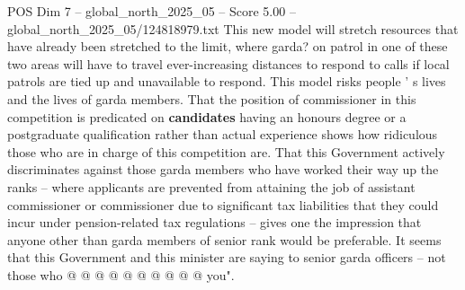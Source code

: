 \begin{textsample}{POS Dim 7 – global\_north\_2025\_05 – Score 5.00 – global\_north\_2025\_05/124818979.txt}
This new model will stretch resources that have already been stretched to the limit, where garda? on patrol in one of these two areas will have to travel ever-increasing distances to respond to calls if local patrols are tied up and unavailable to respond.
This model risks people ' s lives and the lives of garda members.
That the position of commissioner in this competition is predicated on \textbf{candidates} having an honours degree or a postgraduate qualification rather than actual experience shows how ridiculous those who are in charge of this competition are.
That this Government actively discriminates against those garda members who have worked their way up the ranks -- where applicants are prevented from attaining the job of assistant commissioner or commissioner due to significant tax liabilities that they could incur under pension-related tax regulations -- gives one the impression that anyone other than garda members of senior rank would be preferable.
It seems that this Government and this minister are saying to senior garda officers -- not those who @ @ @ @ @ @ @ @ @ @ you".

\end{textsample}
